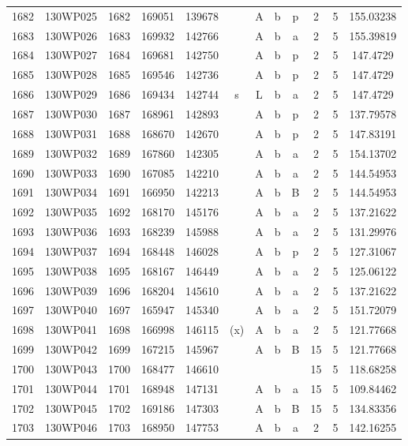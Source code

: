 \begin{tabular}{|*{12}{c|}}
1682 & 130WP025 & 1682 & 169051 & 139678 &  & A & b & p & 2 & 5 & 155.03238 \\ 
1683 & 130WP026 & 1683 & 169932 & 142766 &  & A & b & a & 2 & 5 & 155.39819 \\ 
1684 & 130WP027 & 1684 & 169681 & 142750 &  & A & b & p & 2 & 5 & 147.4729 \\ 
1685 & 130WP028 & 1685 & 169546 & 142736 &  & A & b & p & 2 & 5 & 147.4729 \\ 
1686 & 130WP029 & 1686 & 169434 & 142744 & s & L & b & a & 2 & 5 & 147.4729 \\ 
1687 & 130WP030 & 1687 & 168961 & 142893 &  & A & b & p & 2 & 5 & 137.79578 \\ 
1688 & 130WP031 & 1688 & 168670 & 142670 &  & A & b & p & 2 & 5 & 147.83191 \\ 
1689 & 130WP032 & 1689 & 167860 & 142305 &  & A & b & a & 2 & 5 & 154.13702 \\ 
1690 & 130WP033 & 1690 & 167085 & 142210 &  & A & b & a & 2 & 5 & 144.54953 \\ 
1691 & 130WP034 & 1691 & 166950 & 142213 &  & A & b & B & 2 & 5 & 144.54953 \\ 
1692 & 130WP035 & 1692 & 168170 & 145176 &  & A & b & a & 2 & 5 & 137.21622 \\ 
1693 & 130WP036 & 1693 & 168239 & 145988 &  & A & b & a & 2 & 5 & 131.29976 \\ 
1694 & 130WP037 & 1694 & 168448 & 146028 &  & A & b & p & 2 & 5 & 127.31067 \\ 
1695 & 130WP038 & 1695 & 168167 & 146449 &  & A & b & a & 2 & 5 & 125.06122 \\ 
1696 & 130WP039 & 1696 & 168204 & 145610 &  & A & b & a & 2 & 5 & 137.21622 \\ 
1697 & 130WP040 & 1697 & 165947 & 145340 &  & A & b & a & 2 & 5 & 151.72079 \\ 
1698 & 130WP041 & 1698 & 166998 & 146115 & (x) & A & b & a & 2 & 5 & 121.77668 \\ 
1699 & 130WP042 & 1699 & 167215 & 145967 &  & A & b & B & 15 & 5 & 121.77668 \\ 
1700 & 130WP043 & 1700 & 168477 & 146610 &  &  &  &  & 15 & 5 & 118.68258 \\ 
1701 & 130WP044 & 1701 & 168948 & 147131 &  & A & b & a & 15 & 5 & 109.84462 \\ 
1702 & 130WP045 & 1702 & 169186 & 147303 &  & A & b & B & 15 & 5 & 134.83356 \\ 
1703 & 130WP046 & 1703 & 168950 & 147753 &  & A & b & a & 2 & 5 & 142.16255 \\ 

\end{tabular}
